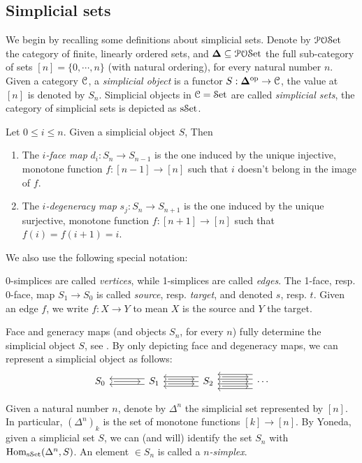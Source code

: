 \documentclass[10pt]{amsart}
\numberwithin{equation}{section}
\begin{document}
\subsection{Simplicial sets}
We begin by recalling some definitions about simplicial sets. Denote by $\mathcal{P}\mathcal{O}\mathcal{S}\mathrm{et}$ the category of finite, linearly ordered sets, and $\bm{\Delta}\subseteq\mathcal{P}\mathcal{O}\mathcal{S}\mathrm{et}$ the full sub-category of sets $[n]=\{0,\cdots,n\}$ (with natural ordering), for every natural number $n$. Given a category $\mathcal{C}$, a \emph{simplicial object} is a functor $S:\bm{\Delta}^{\mathrm{op}}\to\mathcal{C}$, the value at $[n]$ is denoted by $S_n$. Simplicial objects in $\mathcal{C}=\mathcal{S}\mathrm{et}$ are called \emph{simplicial sets}, the category of simplicial sets is depicted as $\mathrm{s}\mathcal{S}\mathrm{et}$. 
\begin{definition}
  Let $0\leq i\leq n$. Given a simplicial object $S$, Then \begin{enumerate}
    \item The \emph{$i$-face map} $d_i:S_n\to S_{n-1}$ is the one induced by the unique injective, monotone function $f:[n-1]\to[n]$ such that $i$ doesn't belong in the image of $f$. 
    \item The \emph{$i$-degeneracy map} $s_j:S_{n}\to S_{n+1}$ is the one induced by the unique surjective, monotone function $f:[n+1]\to[n]$ such that $f(i)=f(i+1)=i$. 
  \end{enumerate}
\end{definition}
We also use the following special notation: 
\begin{notation}
  0-simplices are called \emph{vertices}, while 1-simplices are called \emph{edges}. The 1-face, resp. 0-face, map $S_1\to S_0$ is called \emph{source}, resp. \emph{target}, and denoted $s$, resp. $t$. Given an edge $f$, we write $f:X\to Y$ to mean $X$ is the source and $Y$ the target. 
\end{notation}
Face and generacy maps (and objects $S_n$, for every $n$) fully determine the simplicial object $S$, see \cite[I.4]{goerssjardine1999simplicialhomotopytheory}. By only depicting face and degeneracy maps, we can represent a simplicial object as follows:
\begin{equation}
\simpset{S_0}{S_1}{S_2}{}{}{}{}  
\end{equation}
\begin{example}
  Given a natural number $n$, denote by $\Delta^n$ the simplicial set represented by $[n]$. In particular, $(\Delta^n)_k$ is the set of monotone functions $[k]\to[n]$. By Yoneda, given a simplicial set $S$, we can (and will) identify the set $S_n$ with $\mathrm{Hom}_{\mathrm{s}\mathcal{S}\mathrm{et}}(\Delta^n,S)$. An element $\in S_n$ is called a \emph{$n$-simplex}. 
\end{example}
\end{document}
